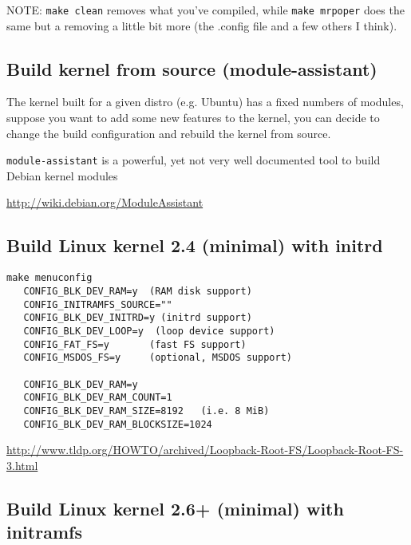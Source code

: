 NOTE: \verb!make clean! removes what you've compiled, while \verb!make mrpoper!
does the same but a removing a little bit more (the .config file and a few
others I think).

\subsection{Build kernel from source (module-assistant)}
\label{sec:Linux_kernel_rebuild}

The kernel built for a given distro (e.g. Ubuntu) has a fixed numbers of
modules, suppose you want to add some new features to the kernel, you can decide
to change the build configuration and rebuild the kernel from source.

\verb!module-assistant! is a powerful, yet not very well documented tool to
build Debian kernel modules 

\url{http://wiki.debian.org/ModuleAssistant}



\subsection{Build Linux kernel 2.4 (minimal) with initrd}
\label{sec:build_Linux-kernel-with-initrd}

\begin{verbatim}
make menuconfig
   CONFIG_BLK_DEV_RAM=y  (RAM disk support)
   CONFIG_INITRAMFS_SOURCE=""
   CONFIG_BLK_DEV_INITRD=y (initrd support)
   CONFIG_BLK_DEV_LOOP=y  (loop device support)
   CONFIG_FAT_FS=y       (fast FS support)
   CONFIG_MSDOS_FS=y     (optional, MSDOS support)
   
   CONFIG_BLK_DEV_RAM=y
   CONFIG_BLK_DEV_RAM_COUNT=1
   CONFIG_BLK_DEV_RAM_SIZE=8192   (i.e. 8 MiB)
   CONFIG_BLK_DEV_RAM_BLOCKSIZE=1024
\end{verbatim}

\url{http://www.tldp.org/HOWTO/archived/Loopback-Root-FS/Loopback-Root-FS-3.html}

\subsection{Build Linux kernel 2.6+ (minimal) with initramfs}
\label{sec:build_Linux-kernel-with-initramfs}

